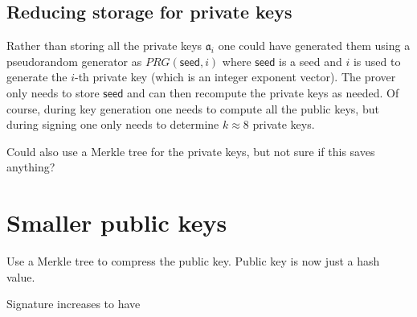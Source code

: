 \documentclass{llncs}
\newcommand{\seed}{\textsf{seed}}
\renewcommand{\a}{\mathfrak{a}}
\begin{document}
\subsection{Reducing storage for private keys}

Rather than storing all the private keys $\a_i$ one could have generated them using a pseudorandom generator as $PRG( \seed, i )$ where $\seed$ is a seed and $i$ is used to generate the $i$-th private key (which is an integer exponent vector).
The prover only needs to store $\seed$ and can then recompute the private keys as needed.
Of course, during key generation one needs to compute all the public keys, but during signing one only needs to determine $k \approx 8$ private keys.

Could also use a Merkle tree for the private keys, but not sure if this saves anything?



\section{Smaller public keys}

Use a Merkle tree to compress the public key.
Public key is now just a hash value.

Signature increases to have 




\end{document}
